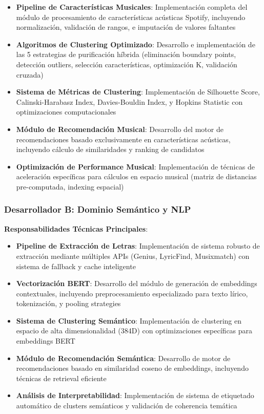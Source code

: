 \documentclass[12pt,a4paper]{article}
\begin{document}
\begin{itemize}
    \item \textbf{Pipeline de Características Musicales}: Implementación completa del módulo de procesamiento de características acústicas Spotify, incluyendo normalización, validación de rangos, e imputación de valores faltantes
    \item \textbf{Algoritmos de Clustering Optimizado}: Desarrollo e implementación de las 5 estrategias de purificación híbrida (eliminación boundary points, detección outliers, selección características, optimización K, validación cruzada)
    \item \textbf{Sistema de Métricas de Clustering}: Implementación de Silhouette Score, Calinski-Harabasz Index, Davies-Bouldin Index, y Hopkins Statistic con optimizaciones computacionales
    \item \textbf{Módulo de Recomendación Musical}: Desarrollo del motor de recomendaciones basado exclusivamente en características acústicas, incluyendo cálculo de similaridades y ranking de candidatos
    \item \textbf{Optimización de Performance Musical}: Implementación de técnicas de aceleración específicas para cálculos en espacio musical (matriz de distancias pre-computada, indexing espacial)
\end{itemize}


\subsubsection{Desarrollador B: Dominio Semántico y NLP}

\textbf{Responsabilidades Técnicas Principales}:

\begin{itemize}
    \item \textbf{Pipeline de Extracción de Letras}: Implementación de sistema robusto de extracción mediante múltiples APIs (Genius, LyricFind, Musixmatch) con sistema de fallback y cache inteligente
    \item \textbf{Vectorización BERT}: Desarrollo del módulo de generación de embeddings contextuales, incluyendo preprocesamiento especializado para texto lírico, tokenización, y pooling strategies
    \item \textbf{Sistema de Clustering Semántico}: Implementación de clustering en espacio de alta dimensionalidad (384D) con optimizaciones específicas para embeddings BERT
    \item \textbf{Módulo de Recomendación Semántica}: Desarrollo de motor de recomendaciones basado en similaridad coseno de embeddings, incluyendo técnicas de retrieval eficiente
    \item \textbf{Análisis de Interpretabilidad}: Implementación de sistema de etiquetado automático de clusters semánticos y validación de coherencia temática
\end{itemize}
\end{document}
